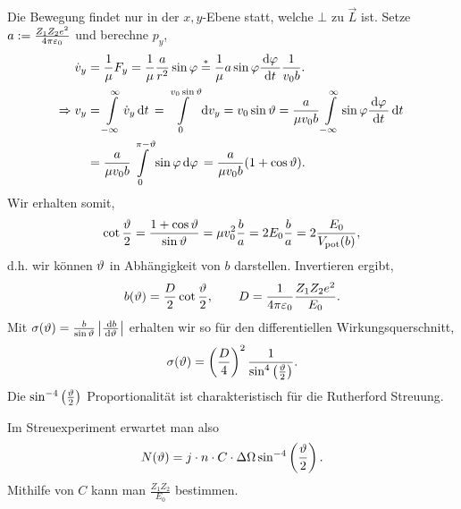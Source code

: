 Die Bewegung findet nur in der $x,y$-Ebene statt, welche $\bot$ zu $\vec{L}$
ist. Setze $a:= \frac{Z_1Z_2 e^2}{4\pi\varepsilon_0}$ und berechne $p_y$,
\begin{align*}
\dot{v}_y &= \frac{1}{\mu} F_y = \frac{1}{\mu}\frac{a}{r^2}\sin\varphi
\overset{*}{=} \frac{1}{\mu}a\sin\varphi \frac{\,\mathrm{d} \varphi\,}{\,\mathrm{d} t\,}\frac{1}{v_0 b}.\\
\Rightarrow 
v_y &= \int\limits_{-\infty}^\infty \dot{v}_y \,\mathrm{d} t\, = \int\limits_{0}^{v_0\sin\vartheta}
\mathrm{d} v_y = v_0\sin\vartheta
= \frac{a}{\mu v_0 b}\int\limits_{-\infty}^\infty \sin\varphi \frac{\,\mathrm{d} \varphi\,}{\,\mathrm{d} t\,}\,\mathrm{d} t\,\\
&= \frac{a}{\mu v_0 b}\int\limits_{0}^{\pi-\vartheta} \sin\varphi \,\mathrm{d} \varphi\,
= \frac{a}{\mu v_0 b}(1+\cos\vartheta).
\end{align*}
Wir erhalten somit,
\begin{align*}
\cot \frac{\vartheta}{2} = 
\frac{1+\cos\vartheta}{\sin\vartheta}=
\mu v_0^2\frac{b}{a} = 2 E_0 \frac{b}{a} = 2 \frac{E_0}{V_\text{pot}(b)},
\end{align*}
d.h. wir können $\vartheta$ in Abhängigkeit von $b$ darstellen. Invertieren ergibt,
\begin{align*}
b(\vartheta) = \frac{D}{2}\cot\frac{\vartheta}{2},\qquad D=\frac{1}{4\pi\varepsilon_0}\frac{Z_1Z_2e^2}{E_0}.
\end{align*}
Mit $\sigma(\vartheta) = \frac{b}{\sin\vartheta}\left|\frac{\,\mathrm{d} b}{\,\mathrm{d} \vartheta\,}\right|$ erhalten wir so für
den differentiellen Wirkungsquerschnitt,
\begin{align*}
\sigma(\vartheta) =
\left(\frac{D}{4}\right)^2\frac{1}{\sin^4\left(\frac{\vartheta}{2}\right)}.
\end{align*}
Die $\sin^{-4}\left(\frac{\vartheta}{2}\right)$ Proportionalität ist
charakteristisch für die Rutherford Streuung.

Im Streuexperiment erwartet man also
\begin{align*}
N(\vartheta) = j\cdot n \cdot C \cdot \Delta\Omega
\sin^{-4}\left(\frac{\vartheta}{2}\right).
\end{align*}
Mithilfe von $C$ kann man $\frac{Z_1Z_2}{E_0}$ bestimmen.


